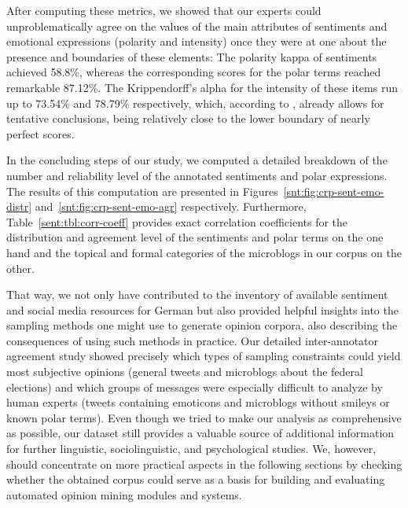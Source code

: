 After computing these metrics, we showed that our experts could
unproblematically agree on the values of the main attributes of
sentiments and emotional expressions (polarity and intensity) once
they were at one about the presence and boundaries of these elements:
The polarity kappa of sentiments achieved 58.8\%, whereas the
corresponding scores for the polar terms reached remarkable 87.12\%.
The Krippendorff's alpha for the intensity of these items run up to
73.54\% and 78.79\% respectively, which, according to
\citet{Krippendorff:07}, already allows for tentative conclusions,
being relatively close to the lower boundary of nearly perfect scores.

In the concluding steps of our study, we computed a detailed breakdown
of the number and reliability level of the annotated sentiments and
polar expressions.  The results of this computation are presented in
Figures~\ref{snt:fig:crp-sent-emo-distr}
and~\ref{snt:fig:crp-sent-emo-agr} respectively.  Furthermore,
Table~\ref{sent:tbl:corr-coeff} provides exact correlation
coefficients for the distribution and agreement level of the
sentiments and polar terms on the one hand and the topical and formal
categories of the microblogs in our corpus on the other.

That way, we not only have contributed to the inventory of available
sentiment and social media resources for German but also provided
helpful insights into the sampling methods one might use to generate
opinion corpora, also describing the consequences of using such
methods in practice.  Our detailed inter-annotator agreement study
showed precisely which types of sampling constraints could yield most
subjective opinions (general tweets and microblogs about the federal
elections) and which groups of messages were especially difficult to
analyze by human experts (tweets containing emoticons and microblogs
without smileys or known polar terms).  Even though we tried to make
our analysis as comprehensive as possible, our dataset still provides
a valuable source of additional information for further linguistic,
sociolinguistic, and psychological studies.  We, however, should
concentrate on more practical aspects in the following sections by
checking whether the obtained corpus could serve as a basis for
building and evaluating automated opinion mining modules and systems.

\newpage
